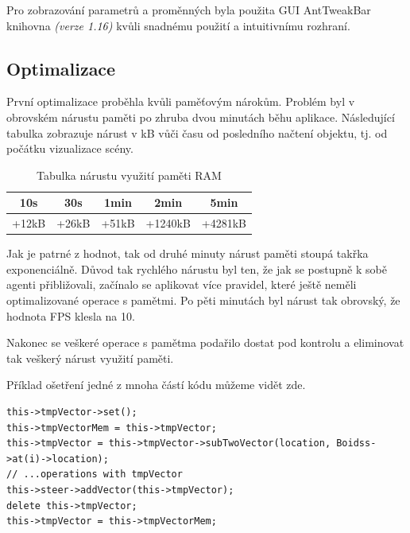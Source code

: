\documentclass[czech,public,dept460,male,cpdeclaration]{diploma}
\begin{document}
Pro zobrazování parametrů a proměnných byla použita GUI AntTweakBar knihovna \textit{(verze 1.16)} \cite{linkToAntTweakBar} kvůli snadnému použití a intuitivnímu rozhraní.

\subsection{Optimalizace}

První optimalizace proběhla kvůli paměťovým nárokům. Problém byl v obrovském nárustu paměti po zhruba dvou minutách běhu aplikace. Následující tabulka zobrazuje nárust v kB vůči času od posledního načtení objektu, tj. od počátku vizualizace scény.

\begin{table}[H]
	\centering
	\caption{Tabulka nárustu využití paměti RAM}
	\label{tab:ramoptimalization}
	\renewcommand{\arraystretch}{1.5}
	\begin{tabular}{| c | c | c | c | c |}
		\hline
		10s & 30s & 1min & 2min & 5min\\\hline
		+12kB & +26kB & +51kB & +1240kB & +4281kB\\
		\hline
	\end{tabular}
\end{table}

Jak je patrné z hodnot, tak od druhé minuty nárust paměti stoupá takřka exponenciálně. Důvod tak rychlého nárustu byl ten, že jak se postupně k sobě agenti přibližovali, začínalo se aplikovat více pravidel, které ještě neměli optimalizované operace s pamětmi. Po pěti minutách byl nárust tak obrovský, že hodnota FPS klesla na 10. 

Nakonec se veškeré operace s pamětma podařilo dostat pod kontrolu a eliminovat tak veškerý nárust využití paměti. 

Příklad ošetření jedné z mnoha částí kódu můžeme vidět zde.

\begin{lstlisting}[label=src:memory elimination,caption=Ukázka eliminace nárustu paměti]
this->tmpVector->set();
this->tmpVectorMem = this->tmpVector;
this->tmpVector = this->tmpVector->subTwoVector(location, Boidss->at(i)->location);
// ...operations with tmpVector
this->steer->addVector(this->tmpVector);
delete this->tmpVector;
this->tmpVector = this->tmpVectorMem;
\end{lstlisting}
\end{document}
